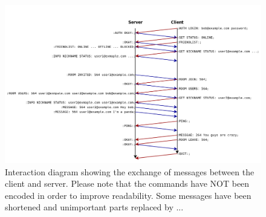\newpage
\begin{landscape}
    \begin{figure}[!h]
        \begin{center}
            \includegraphics[scale=0.60]{Design/diagrams/protocol_interaction.png}
            \caption{Interaction diagram showing the exchange of messages between the client and server. Please note that the commands have NOT been encoded in order to improve readability. Some messages have been shortened and unimportant parts replaced by ...}
            \label{interactionDia}
        \end{center}
    \end{figure}
\end{landscape}

